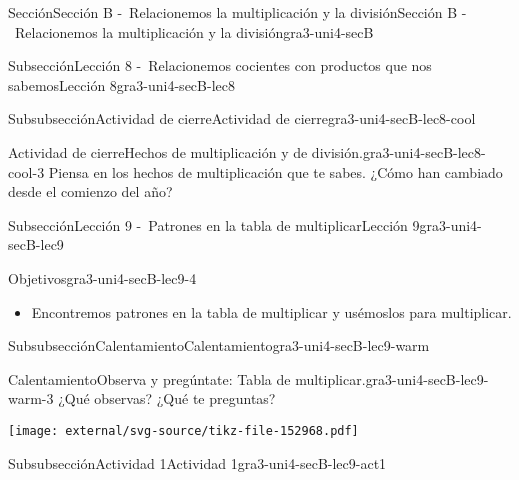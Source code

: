 \documentclass[twoside,10pt,]{article}
\begin{document}
\begin{sectionptx}{Sección}{Sección B -~Relacionemos la multiplicación y la división}{}{Sección B -~Relacionemos la multiplicación y la división}{}{}{gra3-uni4-secB}
\begin{subsectionptx}{Subsección}{Lección 8 -~Relacionemos cocientes con productos que nos sabemos}{}{Lección 8}{}{}{gra3-uni4-secB-lec8}
%
%
\typeout{************************************************}
\typeout{************************************************}
%
\begin{subsubsectionptx}{Subsubsección}{Actividad de cierre}{}{Actividad de cierre}{}{}{gra3-uni4-secB-lec8-cool}
\begin{project}{Actividad de cierre}{Hechos de multiplicación y de división.}{gra3-uni4-secB-lec8-cool-3}%
Piensa en los hechos de multiplicación que te sabes. ¿Cómo han cambiado desde el comienzo del año?%
\end{project}%
\end{subsubsectionptx}
\end{subsectionptx}
%
%
\typeout{************************************************}
\typeout{************************************************}
%
\begin{subsectionptx}{Subsección}{Lección 9 -~Patrones en la tabla de multiplicar}{}{Lección 9}{}{}{gra3-uni4-secB-lec9}
\begin{objectives}{Objetivos}{gra3-uni4-secB-lec9-4}
%
\begin{itemize}[label=\textbullet]
\item{}Encontremos patrones en la tabla de multiplicar y usémoslos para multiplicar.%
\end{itemize}
\end{objectives}
%
%
\typeout{************************************************}
\typeout{************************************************}
%
\begin{subsubsectionptx}{Subsubsección}{Calentamiento}{}{Calentamiento}{}{}{gra3-uni4-secB-lec9-warm}
\begin{exploration}{Calentamiento}{Observa y pregúntate: Tabla de multiplicar.}{gra3-uni4-secB-lec9-warm-3}%
¿Qué observas? ¿Qué te preguntas?%
\begin{image}{0}{1}{0}{}%
\texttt{[image: external/svg-source/tikz-file-152968.pdf]}
\end{image}%
\end{exploration}%
\end{subsubsectionptx}
%
%
\typeout{************************************************}
\typeout{************************************************}
%
\begin{subsubsectionptx}{Subsubsección}{Actividad 1}{}{Actividad 1}{}{}{gra3-uni4-secB-lec9-act1}

\end{subsubsectionptx}
\end{subsectionptx}
\end{sectionptx}
\end{document}
